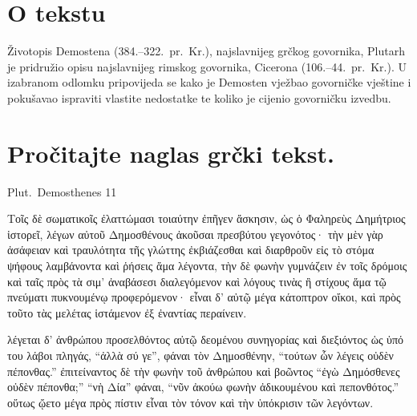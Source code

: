 


\section*{O tekstu}

Životopis Demostena (384.–322.\ pr.~Kr.), najslavnijeg grčkog govornika, Plutarh je pridružio opisu najslavnijeg rimskog govornika, Cicerona (106.–44.\ pr.~Kr.). U izabranom odlomku pripovijeda se kako je Demosten vježbao govorničke vještine i pokušavao ispraviti vlastite nedostatke te koliko je cijenio govorničku izvedbu.


\section*{Pročitajte naglas grčki tekst.}
Plut.\ Demosthenes 11

\medskip

{\large
\begin{greek}

\noindent Τοῖς δὲ σωματικοῖς ἐλαττώμασι τοιαύτην ἐπῆγεν ἄσκησιν, ὡς ὁ Φαληρεὺς Δημήτριος ἱστορεῖ, λέγων αὐτοῦ Δημοσθένους ἀκοῦσαι πρεσβύτου γεγονότος· τὴν μὲν γὰρ ἀσάφειαν καὶ τραυλότητα τῆς γλώττης ἐκβιάζεσθαι καὶ διαρθροῦν εἰς τὸ στόμα ψήφους λαμβάνοντα καὶ ῥήσεις ἅμα λέγοντα, τὴν δὲ φωνὴν γυμνάζειν ἐν τοῖς δρόμοις καὶ ταῖς πρὸς τὰ σιμ' ἀναβάσεσι διαλεγόμενον καὶ λόγους τινὰς ἢ στίχους ἅμα τῷ πνεύματι πυκνουμένῳ προφερόμενον· εἶναι δ' αὐτῷ μέγα κάτοπτρον οἴκοι, καὶ πρὸς τοῦτο τὰς μελέτας ἱστάμενον ἐξ ἐναντίας περαίνειν. 

λέγεται δ' ἀνθρώπου προσελθόντος αὐτῷ δεομένου συνηγορίας καὶ διεξιόντος ὡς ὑπό του λάβοι πληγάς, ``ἀλλὰ σύ γε'', φάναι τὸν Δημοσθένην, ``τούτων ὧν λέγεις οὐδὲν πέπονθας.'' ἐπιτείναντος δὲ τὴν φωνὴν τοῦ ἀνθρώπου καὶ βοῶντος ``ἐγὼ Δημόσθενες οὐδὲν πέπονθα;'' ``νὴ Δία'' φάναι, ``νῦν ἀκούω φωνὴν ἀδικουμένου καὶ πεπονθότος.'' οὕτως ᾤετο μέγα πρὸς πίστιν εἶναι τὸν τόνον καὶ τὴν ὑπόκρισιν τῶν λεγόντων.

\end{greek}

}


